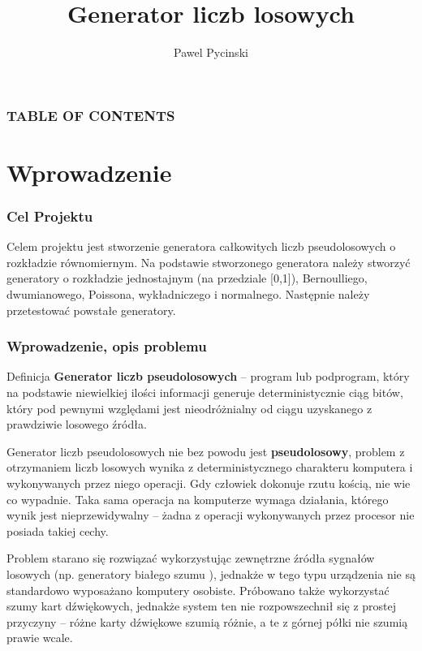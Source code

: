 \documentclass[9pt]{beamer}
\title{Generator liczb losowych}
\author{Pawel Pycinski}
\institute{Uniwesytet Jagielloński}
\begin{document}
\titlepage

\begin{frame}

 \frametitle{TABLE OF CONTENTS}
 \tableofcontents
\end{frame}
\section{Wprowadzenie}
\begin{frame}
  \frametitle{Cel Projektu}
  Celem projektu jest stworzenie generatora całkowitych liczb pseudolosowych o rozkładzie równomiernym. Na podstawie stworzonego generatora należy stworzyć generatory o rozkładzie jednostajnym (na przedziale [0,1]), Bernoulliego, dwumianowego, Poissona, wykładniczego i normalnego. Następnie należy przetestować powstałe generatory.
\end{frame}
\begin{frame}
  \frametitle{Wprowadzenie, opis problemu}
  \begin{block}{Definicja}
    \textbf{Generator liczb pseudolosowych} – program lub podprogram, który na podstawie niewielkiej ilości informacji generuje deterministycznie ciąg bitów, który pod pewnymi względami jest nieodróżnialny od ciągu uzyskanego z prawdziwie losowego źródła.
    \end{block}

  Generator liczb pseudolosowych nie bez powodu jest \textbf{pseudolosowy}, problem z otrzymaniem liczb losowych wynika z deterministycznego charakteru komputera i wykonywanych przez niego operacji. Gdy człowiek dokonuje rzutu kością, nie wie co wypadnie. Taka sama operacja na komputerze wymaga działania, którego wynik jest nieprzewidywalny – żadna z operacji wykonywanych przez procesor nie posiada takiej cechy.

  Problem starano się rozwiązać wykorzystując zewnętrzne źródła sygnałów losowych (np. generatory białego szumu ), jednakże w tego typu urządzenia nie są standardowo wyposażano komputery osobiste. Próbowano także wykorzystać szumy kart dźwiękowych, jednakże system ten nie rozpowszechnił się z prostej przyczyny – różne karty dźwiękowe szumią różnie, a te z górnej półki nie szumią prawie wcale.
\end{frame}
\end{document}
